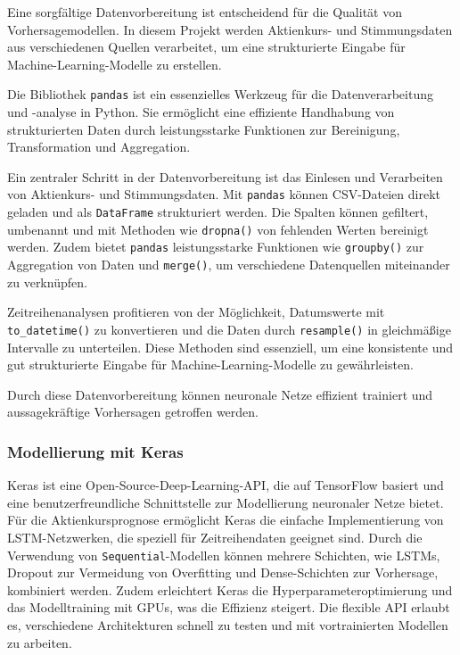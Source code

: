 Eine sorgfältige Datenvorbereitung ist entscheidend für die Qualität von Vorhersagemodellen. In diesem Projekt werden Aktienkurs- und Stimmungsdaten aus verschiedenen Quellen verarbeitet, um eine strukturierte Eingabe für Machine-Learning-Modelle zu erstellen.

Die Bibliothek \texttt{pandas} ist ein essenzielles Werkzeug für die Datenverarbeitung und -analyse in Python. Sie ermöglicht eine effiziente Handhabung von strukturierten Daten durch leistungsstarke Funktionen zur Bereinigung, Transformation und Aggregation.

Ein zentraler Schritt in der Datenvorbereitung ist das Einlesen und Verarbeiten von Aktienkurs- und Stimmungsdaten. Mit \texttt{pandas} können CSV-Dateien direkt geladen und als \texttt{DataFrame} strukturiert werden. Die Spalten können gefiltert, umbenannt und mit Methoden wie \texttt{dropna()} von fehlenden Werten bereinigt werden. Zudem bietet \texttt{pandas} leistungsstarke Funktionen wie \texttt{groupby()} zur Aggregation von Daten und \texttt{merge()}, um verschiedene Datenquellen miteinander zu verknüpfen.

Zeitreihenanalysen profitieren von der Möglichkeit, Datumswerte mit \texttt{to\_datetime()} zu konvertieren und die Daten durch \texttt{resample()} in gleichmäßige Intervalle zu unterteilen. Diese Methoden sind essenziell, um eine konsistente und gut strukturierte Eingabe für Machine-Learning-Modelle zu gewährleisten.

Durch diese Datenvorbereitung können neuronale Netze effizient trainiert und aussagekräftige Vorhersagen getroffen werden.

\autocite{han2022data}
\autocite{jain2016time}

\subsubsection{Modellierung mit Keras}\label{sec:modellierung-keras}

Keras ist eine Open-Source-Deep-Learning-API, die auf TensorFlow basiert und eine benutzerfreundliche Schnittstelle zur Modellierung neuronaler Netze bietet. Für die Aktienkursprognose ermöglicht Keras die einfache Implementierung von LSTM-Netzwerken, die speziell für Zeitreihendaten geeignet sind. Durch die Verwendung von \texttt{Sequential}-Modellen können mehrere Schichten, wie LSTMs, Dropout zur Vermeidung von Overfitting und Dense-Schichten zur Vorhersage, kombiniert werden. Zudem erleichtert Keras die Hyperparameteroptimierung und das Modelltraining mit GPUs, was die Effizienz steigert. Die flexible API erlaubt es, verschiedene Architekturen schnell zu testen und mit vortrainierten Modellen zu arbeiten.

